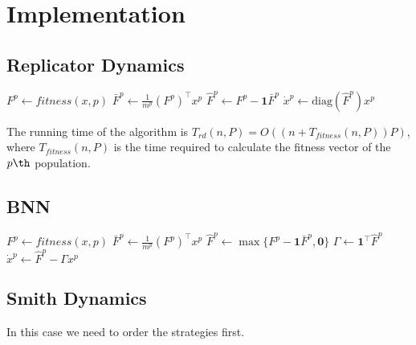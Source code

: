 \section{Implementation}

\subsection{Replicator Dynamics}

\begin{algorithm}[H]

 \BlankLine
 
  {
  $ F^p \leftarrow fitness(x, p)$\;
  $ \bar{F}^p \leftarrow \frac{1}{m^p} (F^p)^\top x^p$\;
  $ \hat{F}^p \leftarrow F^p - \boldsymbol{1} \bar{F}^p$\;
  $ \dot{x}^p \leftarrow \text{diag}(\hat{F}^p) x^p $\;
 }
\end{algorithm}


The running time of the algorithm is $T_{rd}(n, P) = O( (n + T_{fitness}(n,P))P ) $, where $T_{fitness}(n,P)$ is the time required to calculate the fitness vector of the $p\th$ population.



\subsection{BNN}

\begin{algorithm}[H]

 \BlankLine
 
  {
  $ F^p \leftarrow fitness(x, p)$\;
  $ \bar{F}^p \leftarrow \frac{1}{m^p} (F^p)^\top x^p$\;
  $ \hat{F}^p \leftarrow \max\{F^p - \boldsymbol{1} \bar{F}^p, \boldsymbol{0}\}$\;
  $ \Gamma \leftarrow \boldsymbol{1}^\top \hat{F}^p $\;
  $ \dot{x}^p \leftarrow \hat{F}^p - \Gamma x^p $\;
 }
\end{algorithm}



\subsection{Smith Dynamics}

In this case we need to order the strategies first. 


